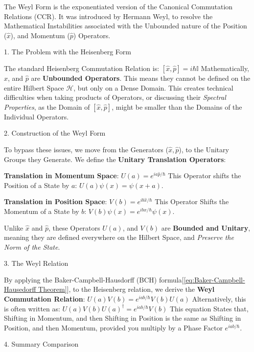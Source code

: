 \documentclass[a4paper, 10pt, onepage]{elegantbook}
\begin{document}
{The Weyl Form is the exponentiated version of the Canonical Commutation Relations (CCR). It was introduced by Hermann 
Weyl, to resolve the Mathematical Instabilities associated with the Unbounded nature of the Position ($\hat{x}$), and 
Momentum ($\hat{p}$) Operators.  

    1. The Problem with the Heisenberg Form  

The standard Heisenberg Commutation Relation is:  
$[\hat{x}, \hat{p}] = i\hbar \mathbb{I}$  
Mathematically, $\hat{x}$, and $\hat{p}$ are \textbf{Unbounded Operators}. This means they cannot be defined on the 
entire Hilbert Space $\mathcal{H}$, but only on a Dense Domain. This creates technical difficulties when taking 
products of Operators, or discussing their \emph{Spectral Properties}, as the Domain of $[\hat{x}, \hat{p}]$, might be 
smaller than the Domains of the Individual Operators.  

    2. Construction of the Weyl Form  

To bypass these issues, we move from the Generators ($\hat{x}, \hat{p}$), to the Unitary Groups they Generate. We 
define the \textbf{Unitary Translation Operators}:  

\textbf{Translation in Momentum Space}:  
$ U(a) = e^{i a \hat{p} / \hbar}$  
This Operator shifts the Position of a State by $a$: $U(a)\psi(x) = \psi(x+a)$.  

  \textbf{Translation in Position Space}:  
$ V(b) = e^{i b \hat{x} / \hbar}$  
This Operator Shifts the Momentum of a State by $b$: $V(b)\psi(x) = e^{ibx/\hbar}\psi(x)$.  

Unlike $\hat{x}$ and $\hat{p}$, these Operators $U(a)$, and $V(b)$ are \textbf{Bounded and Unitary}, meaning they are 
defined everywhere on the Hilbert Space, and \emph{Preserve the Norm of the State}.  

  3. The Weyl Relation  

By applying the Baker-Campbell-Hausdorff (BCH) formula[\eqref{eq:Baker-Campbell-Hausedorff Theorem}],  to the 
Heisenberg relation, we derive the \textbf{Weyl Commutation Relation}:  
$U(a)V(b) = e^{iab/\hbar} V(b)U(a)$  
Alternatively, this is often written as:  
$ U(a)V(b)U(a)^\dagger = e^{iab/\hbar} V(b)$
This equation States that, Shifting in Momentum, and then Shifting in Position is the same as Shifting in Position, and 
then Momentum, provided you multiply by a Phase Factor $e^{iab/\hbar}$.  

    4. Summary Comparison  

}
\end{document}
